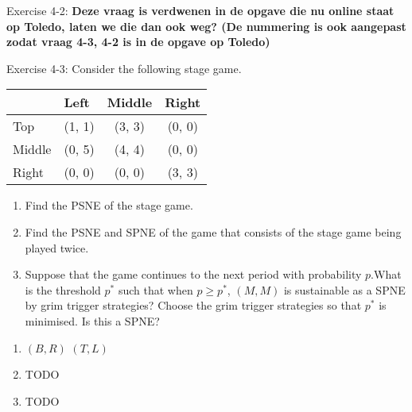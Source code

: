 \documentclass[../main.tex]{subfiles}
\begin{document}
\begin{question}
Exercise 4-2: \textbf{Deze vraag is verdwenen in de opgave die nu online staat op Toledo, laten we die dan ook weg? (De nummering is ook aangepast zodat vraag 4-3, 4-2 is in de opgave op Toledo)}
\end{question}

\begin{solution}
\end{solution}

\begin{question}

Exercise 4-3: Consider the following stage game.
\begin{table}[h]
\centering
\begin{tabular}{lccc}
                            & \multicolumn{1}{l}{Left} & \multicolumn{1}{l}{Middle} & \multicolumn{1}{l}{Right} \\ \hline
\multicolumn{1}{l|}{Top}    & (1, 1)                   & (3, 3)                     & (0, 0)                    \\
\multicolumn{1}{l|}{Middle} & (0, 5)                   & (4, 4)                     & (0, 0)                    \\
\multicolumn{1}{l|}{Right}  & (0, 0)                   & (0, 0)                     & (3, 3)                   
\end{tabular}
\end{table}

\begin{enumerate}
  \item Find the PSNE of the stage game.
  \item Find the PSNE and SPNE of the game that consists of the stage game being played twice.
  \item Suppose that the game continues to the next period with probability $p$.What is the threshold $p^*$ such that when $p \geq p^*$, $(M,M)$ is sustainable as a SPNE by grim trigger strategies? Choose the grim trigger strategies so that $p^*$ is minimised. Is this a SPNE?
\end{enumerate}

\end{question}

\begin{solution}
\begin{enumerate}
\item $(B,R)$ $(T,L)$
\item TODO
\item TODO
\end{enumerate}
\end{solution}
\end{document}
